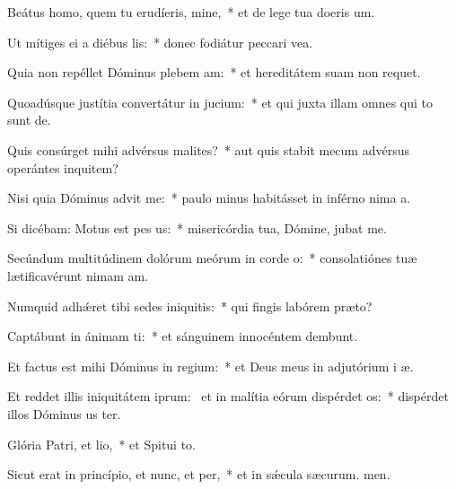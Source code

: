 \item Beátus homo, quem tu erudíeris, mine,~* et de lege tua doeris um.
\item Ut mítiges ei a diébus lis:~* donec fodiátur peccari vea.
\item Quia non repéllet Dóminus plebem am:~* et hereditátem suam non requet.
\item Quoadúsque justítia convertátur in jucium:~* et qui juxta illam omnes qui to sunt de.
\item Quis consúrget mihi advérsus malites?~* aut quis stabit mecum advérsus operántes inquitem?
\item Nisi quia Dóminus advit me:~* paulo minus habitásset in inférno nima a.
\item Si dicébam: Motus est pes us:~* misericórdia tua, Dómine, jubat me.
\item Secúndum multitúdinem dolórum meórum in corde o:~* consolatiónes tuæ lætificavérunt nimam am.
\item Numquid adhǽret tibi sedes iniquitis:~* qui fingis labórem  præto?
\item Captábunt in ánimam ti:~* et sánguinem innocéntem dembunt.
\item Et factus est mihi Dóminus in regium:~* et Deus meus in adjutórium i æ.
\item Et reddet illis iniquitátem iprum:~\pscross{} et in malítia eórum dispérdet os:~* dispérdet illos Dóminus us ter.
\item Glória Patri, et lio,~* et Spitui to.
\item Sicut erat in princípio, et nunc, et per,~* et in sǽcula sæcurum. men.
